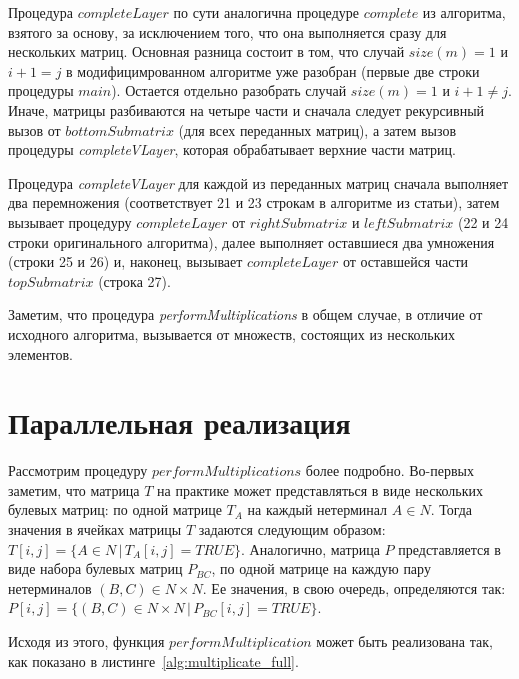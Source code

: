 \documentclass[a4paper,12pt]{article}  %
\theoremstyle{definition}
\theoremstyle{remark}
\begin{document}
Процедура $completeLayer$ по сути аналогична процедуре $complete$ из алгоритма, взятого за основу, за исключением того, что она выполняется сразу для нескольких матриц. Основная разница состоит в том, что случай $size(m) = 1$ и $i + 1 = j$ в модифицимрованном алгоритме уже разобран (первые две строки процедуры $main$). Остается отдельно разобрать случай $size(m) = 1$ и $i + 1 \neq j$.  Иначе, матрицы разбиваются на четыре части и сначала следует рекурсивный вызов от $bottomSubmatrix$ (для всех переданных матриц), а затем вызов процедуры \textit{completeVLayer}, которая обрабатывает верхние части матриц. 

Процедура \textit{completeVLayer} для каждой из переданных матриц сначала выполняет два перемножения (соответствует 21 и 23 строкам в алгоритме из статьи), затем вызывает процедуру $completeLayer$ от $rightSubmatrix$ и $leftSubmatrix$ (22 и 24 строки оригинального алгоритма), далее выполняет оставшиеся два умножения (строки 25 и 26) и, наконец, вызывает $completeLayer$ от оставшейся части $topSubmatrix$ (строка 27).

Заметим, что процедура \textit{performMultiplications} в общем случае, в отличие от исходного алгоритма,  вызывается от множеств, состоящих из нескольких элементов.


\section{Параллельная реализация}
\label{se:parallel}



Рассмотрим процедуру $performMultiplications$ более подробно. Во-первых заметим, что матрица $T$ на практике может представляться в виде нескольких булевых матриц: по одной матрице $T_{A}$ на каждый нетерминал $A \in N$. Тогда значения в ячейках матрицы $T$ задаются следующим образом: $T[i,j] = \{A \in N\,|\,T_{A}[i,j] = TRUE\}$. 
Аналогично, матрица $P$ представляется в виде набора булевых матриц $P_{BC}$, по одной матрице на каждую пару нетерминалов $(B, C) \in N \times N$. 
Ее значения, в свою очередь, определяются так: $P[i,j] = \{(B,C) \in N\times N\,|\,P_{BC}[i,j] = TRUE\}$.

Исходя из этого, функция $performMultiplication$ может быть реализована так, как показано в листинге~\ref{alg:multiplicate_full}.
\end{document}
